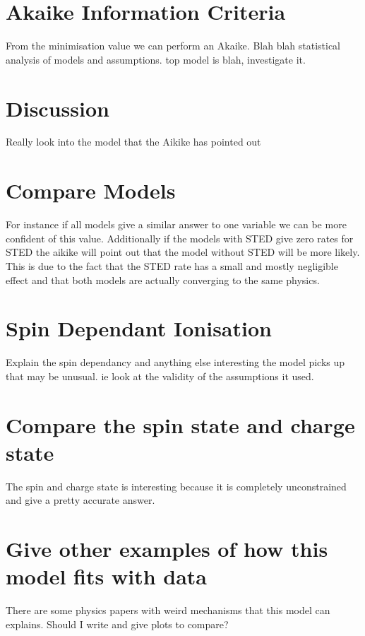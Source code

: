 \documentclass[preprint,prl]{revtex4}
\begin{document}




\section{Akaike Information Criteria}
From the minimisation value we can perform an Akaike.
Blah blah statistical analysis of models and assumptions.
top model is blah, investigate it.

\section{Discussion}
Really look into the model that the Aikike has pointed out

\section{Compare Models}
For instance if all models give a similar answer to one variable we can be more confident of this value. Additionally if the models with STED give zero rates for STED the aikike will point out that the model without STED will be more likely. This is due to the fact that the STED rate has a small and mostly negligible effect and that both models are actually converging to the same physics.

\section{Spin Dependant Ionisation}
Explain the spin dependancy and anything else interesting the model picks up that may be unusual. ie look at the validity of the assumptions it used.


\section{Compare the spin state and charge state}
The spin and charge state is interesting because it is completely unconstrained and give a pretty accurate answer.
\section{Give other examples of how this model fits with data}
There are some physics papers with weird mechanisms that this model can explains. Should I write and give plots to compare?
\end{document}
